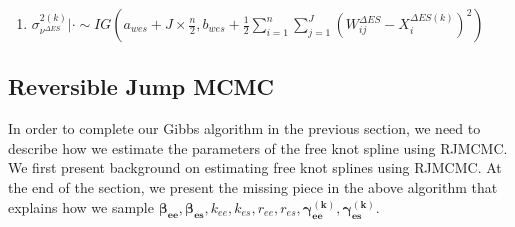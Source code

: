 \documentclass[11pt]{article}\usepackage[]{graphicx}\usepackage[]{color}
\begin{document}
\begin{enumerate}
\begin{enumerate}
\item
 $\sigma^{2(k)}_{\nu^{\Delta ES}} |\cdot \sim IG(a_{wes}+J\times \frac{n}{2},b_{wes}+\frac{1}{2}\sum_{i=1}^{n}\sum_{j=1}^{J}(W_{ij}^{\Delta ES}-X_i^{\Delta ES(k)})^2)$ \\


% 
% 
% 


\end{enumerate}

\end{enumerate}



\subsection{Reversible Jump MCMC}
In order to complete our Gibbs algorithm in the previous section, we need to describe how we estimate the parameters of the free knot spline using RJMCMC. We first present background on estimating free knot splines using RJMCMC. At the end of the section, we present the missing piece in the above algorithm that explains how we sample ${\boldsymbol{\beta_{ee}},\boldsymbol{\beta_{es}}},k_{ee},k_{es}, {  r_{ee}, r_{es}}, \boldsymbol{\gamma_{ee}^{(k)}},\boldsymbol{\gamma_{es}^{(k)}}$. 
\end{document}
